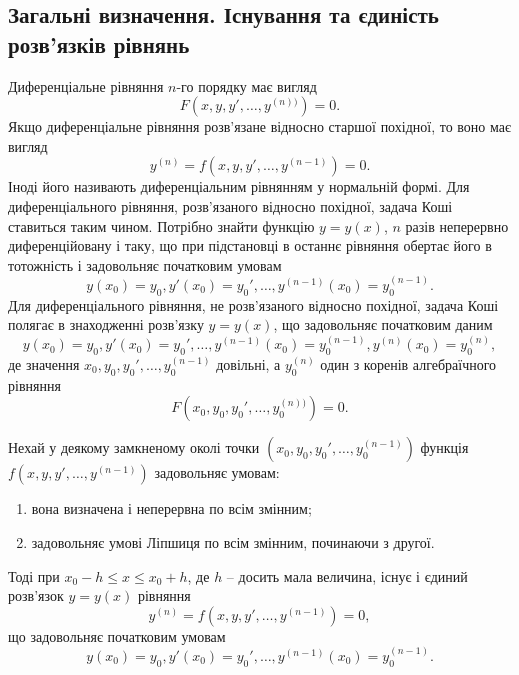 \subsection{Загальні визначення. Існування та єдиність роз\-в’я\-з\-ків рівнянь}

Диференціальне рівняння $n$-го порядку має вигляд
\begin{equation*}
	F \left( x, y, y', \ldots, y^{(n))} \right) = 0.
\end{equation*}
Якщо диференціальне рівняння розв’язане відносно старшої похідної, то воно має вигляд
\begin{equation*}
	y^{(n)} = f \left( x, y, y', \ldots, y^{(n-1)} \right) = 0.
\end{equation*}
Іноді його називають диференціальним рівнянням у нормальній формі. Для диференціального рівняння, розв’язаного відносно похідної, задача Коші ставиться таким чином. Потрібно знайти функцію $y = y(x)$, $n$ разів неперервно диференційовану і таку, що при підстановці в останнє рівняння обертає його в тотожність і задовольняє початковим умовам 
\begin{equation*}
	y(x_0) = y_0, y'(x_0) = y_0', \ldots, y^{(n - 1)} (x_0) = y_0^{(n-1)}.
\end{equation*}
Для диференціального рівняння, не розв’язаного відносно похідної, задача Коші полягає в знаходженні розв’язку $y = y(x)$, що задовольняє початковим даним 
\begin{equation*}
	y(x_0) = y_0, y'(x_0) = y_0', \ldots, y^{(n - 1)} (x_0) = y_0^{(n-1)}, y^{(n)} (x_0) = y_0^{(n)},
\end{equation*}
де значення $x_0, y_0, y_0', \ldots, y_0^{(n-1)}$ довільні, а $y_0^{(n)}$ один з коренів алгебраїчного рівняння 
\begin{equation*}
	F \left( x_0, y_0, y_0', \ldots, y_0^{(n))} \right) = 0.
\end{equation*}

\begin{theorem}
	Нехай у деякому замкненому околі точки $\left(x_0, y_0, y_0', \ldots, y_0^{(n-1)}\right)$ функція $f\left(x,y,y',\ldots,y^{(n-1)}\right)$ задовольняє умовам:
	\begin{enumerate}
		\item вона визначена і неперервна по всім змінним;
		\item задовольняє умові Ліпшиця по всім змінним, починаючи з другої.
	\end{enumerate}
	Тоді при $x_0 - h \le x \le x_0 + h$, де $h$ -- досить мала величина, існує і єдиний розв’язок $y=y(x)$ рівняння
		\begin{equation*}
    	y^{(n)} = f \left( x, y, y', \ldots, y^{(n-1)} \right) = 0,
    \end{equation*}
    що задовольняє початковим умовам 
	\begin{equation*}
    	y(x_0) = y_0, y'(x_0) = y_0', \ldots, y^{(n - 1)} (x_0) = y_0^{(n-1)}.
    \end{equation*}
\end{theorem}
  
